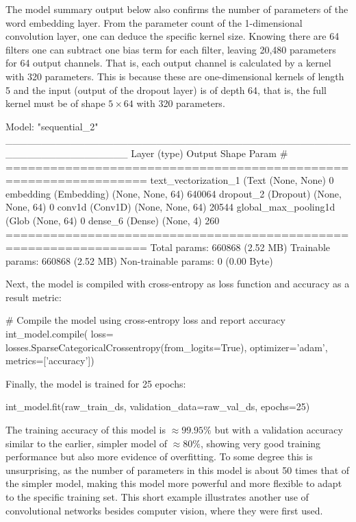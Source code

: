 \begin{withcode}
The model summary output below also confirms the number of parameters of the word embedding layer. From the parameter count of the 1-dimensional convolution layer, one can deduce the specific kernel size. Knowing there are 64 filters one can subtract one bias term for each filter, leaving 20,480 parameters for 64 output channels. That is, each output channel is calculated by a kernel with 320 parameters. This is because these are one-dimensional kernels of length 5 and the input (output of the dropout layer) is of depth 64, that is, the full kernel must be of shape $5 \times 64$ with 320 parameters. 

\begin{textcode}
Model: "sequential_2"
_________________________________________________________________
 Layer (type)                Output Shape              Param #   
=================================================================
 text_vectorization_1 (Text  (None, None)              0         
 embedding (Embedding)       (None, None, 64)          640064    
 dropout_2 (Dropout)         (None, None, 64)          0         
 conv1d (Conv1D)             (None, None, 64)          20544     
 global_max_pooling1d (Glob  (None, 64)                0         
 dense_6 (Dense)             (None, 4)                 260       
=================================================================
Total params: 660868 (2.52 MB)
Trainable params: 660868 (2.52 MB)
Non-trainable params: 0 (0.00 Byte)
\end{textcode}

Next, the model is compiled with cross-entropy as loss function and accuracy as a result metric:

\begin{pythoncode}
# Compile the model using cross-entropy loss and report accuracy
int_model.compile(
    loss= losses.SparseCategoricalCrossentropy(from_logits=True),
    optimizer='adam',
    metrics=['accuracy'])
\end{pythoncode}

Finally, the model is trained for 25 epochs: 

\begin{pythoncode}
int_model.fit(raw_train_ds, 
              validation_data=raw_val_ds, 
              epochs=25)
\end{pythoncode}

The training accuracy of this model is $\approx 99.95\%$ but with a validation accuracy similar to the earlier, simpler model of $\approx 80\%$, showing very good training performance but also more evidence of overfitting. To some degree this is unsurprising, as the number of parameters in this model is about 50 times that of the simpler model, making this model more powerful and more flexible to adapt to the specific training set. This short example illustrates another use of convolutional networks besides computer vision, where they were first used.


\end{withcode}
